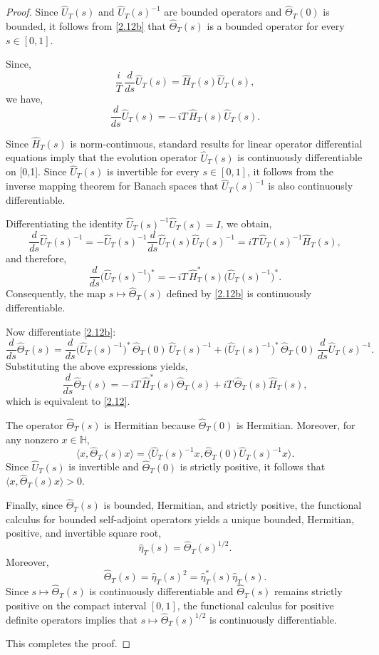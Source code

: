 \documentclass[pdflatex,sn-mathphys-num]{sn-jnl}
\theoremstyle{thmstyleone}
\theoremstyle{thmstyletwo}
\theoremstyle{thmstylethree}
\begin{document}
\begin{proof}
Since $\hat U_T(s)$ and $\hat U_T(s)^{-1}$ are bounded operators and
$\hat\Theta_T(0)$ is bounded, it follows from \eqref{2.12b} that
$\hat\Theta_T(s)$ is a bounded operator for every $s\in[0,1]$.

Since,
\[
\frac{i}{T}\,\frac{d}{ds}\hat U_T(s)=\hat H_T(s)\hat U_T(s),
\]
we have,
\[
\frac{d}{ds}\hat U_T(s)=-\,iT\,\hat H_T(s)\hat U_T(s).
\]

Since $\hat H_T(s)$ is norm-continuous, standard results for linear operator
differential equations imply that the evolution operator $\hat U_T(s)$ is continuously
differentiable on [0,1]. Since $\hat U_T(s)$ is invertible for every
$s\in[0,1]$, it follows from the inverse mapping theorem for Banach spaces that
$\hat U_T(s)^{-1}$ is also continuously differentiable.

Differentiating the identity $\hat U_T(s)^{-1}\hat U_T(s)=I$, we obtain,
\[
\frac{d}{ds}\hat U_T(s)^{-1}
=
-\hat U_T(s)^{-1}\frac{d}{ds}\hat U_T(s)\hat U_T(s)^{-1}
=
iT\,\hat U_T(s)^{-1}\hat H_T(s),
\]
and therefore,
\[
\frac{d}{ds}\big(\hat U_T(s)^{-1}\big)^*
=
-\,iT\,\hat H_T^*(s)\big(\hat U_T(s)^{-1}\big)^*.
\]
Consequently, the map $s\mapsto\hat\Theta_T(s)$ defined by \eqref{2.12b}
is continuously differentiable.

Now differentiate \eqref{2.12b}:
\[
\frac{d}{ds}\hat\Theta_T(s)
=
\frac{d}{ds}\big(\hat U_T(s)^{-1}\big)^*\,\hat\Theta_T(0)\,\hat U_T(s)^{-1}
+
\big(\hat U_T(s)^{-1}\big)^*\,\hat\Theta_T(0)\,\frac{d}{ds}\hat U_T(s)^{-1}.
\]
Substituting the above expressions yields,
\[
\frac{d}{ds}\hat\Theta_T(s)
=
-\,iT\,\hat H_T^*(s)\hat\Theta_T(s)
+
iT\,\hat\Theta_T(s)\hat H_T(s),
\]
which is equivalent to \eqref{2.12}.

The operator $\hat\Theta_T(s)$ is Hermitian because
$\hat\Theta_T(0)$ is Hermitian. Moreover, for any nonzero
$x\in\mathbb{H}$,
\[
\langle x,\hat\Theta_T(s)x\rangle
=
\langle \hat U_T(s)^{-1}x,\hat\Theta_T(0)\hat U_T(s)^{-1}x\rangle.
\]
Since $\hat U_T(s)$ is invertible and $\hat\Theta_T(0)$ is strictly positive,
it follows that $\langle x,\hat\Theta_T(s)x\rangle>0$.

Finally, since \(\hat\Theta_T(s)\) is bounded, Hermitian, and strictly positive,
the functional calculus for bounded self-adjoint operators yields a unique bounded,
Hermitian, positive, and invertible square root,
\[
\hat\eta_T(s)=\hat\Theta_T(s)^{1/2}.
\]
Moreover,
\[
\hat\Theta_T(s)
=
\hat\eta_T(s)^2
=
\hat\eta_T^{*}(s)\hat\eta_T(s).
\]
Since \(s\mapsto\hat\Theta_T(s)\) is continuously differentiable and
\(\hat\Theta_T(s)\) remains strictly positive on the compact interval \([0,1]\), the
functional calculus for positive definite operators implies that
\(s\mapsto\hat\Theta_T(s)^{1/2}\) is continuously differentiable.

This completes the proof.
\end{proof}
\end{document}
